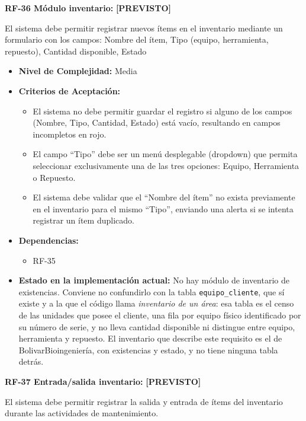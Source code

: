 \documentclass[12pt,a4paper]{article}
\newcommand{\estadoPrevisto}{\textcolor{mainGray}{\textbf{[PREVISTO]}}}
\begin{document}
\textbf{RF-36 Módulo inventario:} \estadoPrevisto{}

El sistema debe permitir registrar nuevos ítems en el inventario mediante un formulario con los campos: Nombre del ítem, Tipo (equipo, herramienta, repuesto), Cantidad disponible, Estado

\begin{itemize}
  \item \textbf{Nivel de Complejidad:} Media

  \item \textbf{Criterios de Aceptación:}
  \begin{itemize}
    \item El sistema no debe permitir guardar el registro si alguno de los campos (Nombre, Tipo, Cantidad, Estado) está vacío, resultando en campos incompletos en rojo.
    \item El campo ``Tipo'' debe ser un menú desplegable (dropdown) que permita seleccionar exclusivamente una de las tres opciones: Equipo, Herramienta o Repuesto.
    \item El sistema debe validar que el ``Nombre del ítem'' no exista previamente en el inventario para el mismo ``Tipo'', enviando una alerta si se intenta registrar un ítem duplicado.
  \end{itemize}

  \item \textbf{Dependencias:}
  \begin{itemize}
    \item RF-35
  \end{itemize}

  \item \textbf{Estado en la implementación actual:} No hay módulo de inventario de existencias. Conviene no confundirlo con la tabla \texttt{equipo\_cliente}, que sí existe y a la que el código llama \emph{inventario de un área}: esa tabla es el censo de las unidades que posee el cliente, una fila por equipo físico identificado por su número de serie, y no lleva cantidad disponible ni distingue entre equipo, herramienta y repuesto. El inventario que describe este requisito es el de BolivarBioingeniería, con existencias y estado, y no tiene ninguna tabla detrás.
\end{itemize}

\textbf{RF-37 Entrada/salida inventario:} \estadoPrevisto{}

El sistema debe permitir registrar la salida y entrada de ítems del inventario durante las actividades de mantenimiento.
\end{document}
